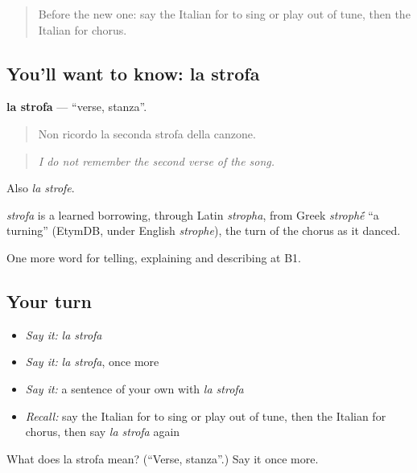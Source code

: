 \begin{quote}
Before the new one: say the Italian for to sing or play out of tune, then the Italian for chorus.
\end{quote}

\subsection*{You'll want to know: la strofa}
\textbf{la strofa} — \textquotedblleft{}verse, stanza\textquotedblright{}.

\begin{quote}
Non ricordo la seconda strofa della canzone.
\end{quote}

\begin{quote}
\emph{I do not remember the second verse of the song.}
\end{quote}

Also \emph{la strofe}.

\begin{cousinweb}
\emph{strofa} is a learned borrowing, through Latin \emph{stropha}, from Greek \emph{stroph\'{\={e}}} \textquotedblleft{}a turning\textquotedblright{} (EtymDB, under English \emph{strophe}), the turn of the chorus as it danced.
\end{cousinweb}

\begin{grammarlens}[title={What you've built}]
One more word for telling, explaining and describing at B1.
\end{grammarlens}

\subsection*{Your turn}
\begin{itemize}
\raggedright
  \item \emph{Say it:} \emph{la strofa}
  \item \emph{Say it:} \emph{la strofa}, once more
  \item \emph{Say it:} a sentence of your own with \emph{la strofa}
  \item \emph{Recall:} say the Italian for to sing or play out of tune, then the Italian for chorus, then say \emph{la strofa} again
\end{itemize}

\begin{tcolorbox}[breakable,colback=teal!4,colframe=teal!35!black,title={Before you move on}]
What does la strofa mean? (\textquotedblleft{}Verse, stanza\textquotedblright{}.) Say it once more.
\end{tcolorbox}
